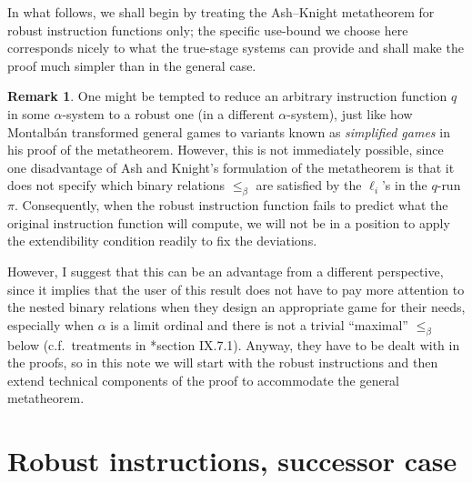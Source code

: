 \documentclass[11pt]{article}
\theoremstyle{plain}
\theoremstyle{definition}
\newtheorem*{remark}{Remark}
\begin{document}
In what follows, we shall begin by treating the Ash--Knight metatheorem for robust instruction functions only; the specific use-bound we choose here corresponds nicely to what the true-stage systems can provide and shall make the proof much simpler than in the general case.

\begin{remark}
  One might be tempted to reduce an arbitrary instruction function $q$ in some $\alpha$-system to a robust one (in a different $\alpha$-system), just like how Montalb\'an \cite{montalban26-computable-structure} transformed general games to variants known as \emph{simplified games} in his proof of the metatheorem. However, this is not immediately possible, since one disadvantage of Ash and Knight's formulation of the metatheorem is that it does not specify which binary relations $\leq_\beta$ are satisfied by the $\ell_i$'s in the $q$-run $\pi$. Consequently, when the robust instruction function fails to predict what the original instruction function will compute, we will not be in a position to apply the extendibility condition readily to fix the deviations.

  However, I suggest that this can be an advantage from a different perspective, since it implies that the user of this result does not have to pay more attention to the nested binary relations when they design an appropriate game for their needs, especially when $\alpha$ is a limit ordinal and there is not a trivial ``maximal'' $\leq_\beta$ below (c.f.\ treatments in \cite{montalban26-computable-structure}*{section IX.7.1}). Anyway, they have to be dealt with in the proofs, so in this note we will start with the robust instructions and then extend technical components of the proof to accommodate the general metatheorem.
\end{remark}

\section{Robust instructions, successor case}
\label{sec:robust-succ}
\end{document}
